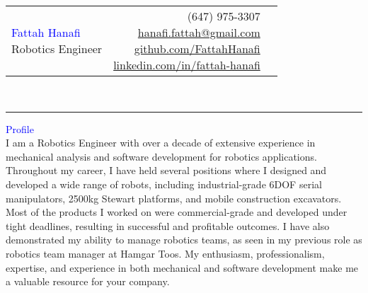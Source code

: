 \documentclass{letter}
\newcommand{\firstlastname}[1]{\noindent\textcolor{Blue}{\Huge{#1}}}
\newcommand{\subtitle}[1]{\noindent\textcolor{NavyBlue}{\Large{#1}}}
\newcommand{\header}[1]{\noindent\textcolor{Blue}{\Large{#1}}\\}
\begin{document}
\begin{tabularx}{0.9\textwidth}{X r l}
	\makecell[l]{\firstlastname{Fattah Hanafi} \\\subtitle{Robotics Engineer}} & \makecell[r]{(647) 975-3307\\\href{mailto:hanafi.fattah@gmail.com}{hanafi.fattah@gmail.com}\\\href{https://github.com/FattahHanafi}{github.com/FattahHanafi}\\\href{https://www.linkedin.com/in/fattah-hanafi/}{linkedin.com/in/fattah-hanafi}} & \makecell[c]{\faPhone\\\faEnvelopeO\\\faGithub\\\faLinkedin}
\end{tabularx}\\
\noindent\rule{\textwidth}{0.4pt}

\header{Profile}
\indent\small{I am a Robotics Engineer with over a decade of extensive experience in mechanical analysis and software development for robotics applications. Throughout my career, I have held several positions where I designed and developed a wide range of robots, including industrial-grade 6DOF serial manipulators, 2500kg Stewart platforms, and mobile construction excavators. Most of the products I worked on were commercial-grade and developed under tight deadlines, resulting in successful and profitable outcomes. I have also demonstrated my ability to manage robotics teams, as seen in my previous role as robotics team manager at Hamgar Toos. My enthusiasm, professionalism, expertise, and experience in both mechanical and software development make me a valuable resource for your company.}
\end{document}
